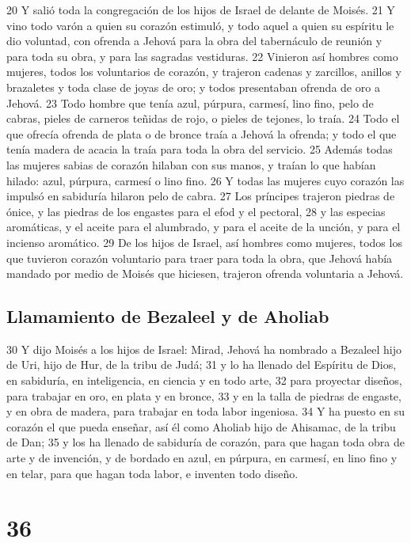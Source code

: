20 Y salió toda la congregación de los hijos de Israel de delante de Moisés.
21 Y vino todo varón a quien su corazón estimuló, y todo aquel a quien su espíritu le dio voluntad, con ofrenda a Jehová para la obra del tabernáculo de reunión y para toda su obra, y para las sagradas vestiduras.
22 Vinieron así hombres como mujeres, todos los voluntarios de corazón, y trajeron cadenas y zarcillos, anillos y brazaletes y toda clase de joyas de oro; y todos presentaban ofrenda de oro a Jehová.
23 Todo hombre que tenía azul, púrpura, carmesí, lino fino, pelo de cabras, pieles de carneros teñidas de rojo, o pieles de tejones, lo traía.
24 Todo el que ofrecía ofrenda de plata o de bronce traía a Jehová la ofrenda; y todo el que tenía madera de acacia la traía para toda la obra del servicio.
25 Además todas las mujeres sabias de corazón hilaban con sus manos, y traían lo que habían hilado: azul, púrpura, carmesí o lino fino.
26 Y todas las mujeres cuyo corazón las impulsó en sabiduría hilaron pelo de cabra.
27 Los príncipes trajeron piedras de ónice, y las piedras de los engastes para el efod y el pectoral,
28 y las especias aromáticas, y el aceite para el alumbrado, y para el aceite de la unción, y para el incienso aromático.
29 De los hijos de Israel, así hombres como mujeres, todos los que tuvieron corazón voluntario para traer para toda la obra, que Jehová había mandado por medio de Moisés que hiciesen, trajeron ofrenda voluntaria a Jehová.

\section*{Llamamiento de Bezaleel y de Aholiab}

30 Y dijo Moisés a los hijos de Israel: Mirad, Jehová ha nombrado a Bezaleel hijo de Uri, hijo de Hur, de la tribu de Judá;
31 y lo ha llenado del Espíritu de Dios, en sabiduría, en inteligencia, en ciencia y en todo arte,
32 para proyectar diseños, para trabajar en oro, en plata y en bronce,
33 y en la talla de piedras de engaste, y en obra de madera, para trabajar en toda labor ingeniosa.
34 Y ha puesto en su corazón el que pueda enseñar, así él como Aholiab hijo de Ahisamac, de la tribu de Dan;
35 y los ha llenado de sabiduría de corazón, para que hagan toda obra de arte y de invención, y de bordado en azul, en púrpura, en carmesí, en lino fino y en telar, para que hagan toda labor, e inventen todo diseño.

\chapter{36}

